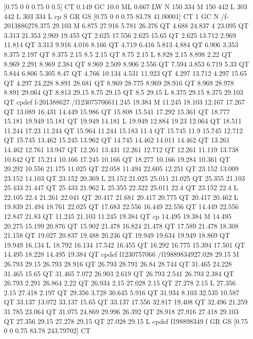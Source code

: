 [0.75 0 0 0.75 0 0.5] CT
0.149 GC
10.0 ML
0.667 LW
N
150 334 M
150 442 L
303 442 L
303 334 L
cp
S
GR
GS
[0.75 0 0 0.75 83.78 41.00001] CT
1 GC
N
/f-201388627{8.375 29.103 M
6.875 27.916 5.781 26.376 QT
4.688 24.837 4 23.095 QT
3.313 21.353 2.969 19.455 QT
2.625 17.556 2.625 15.65 QT
2.625 13.712 2.969 11.814 QT
3.313 9.916 4.016 8.166 QT
4.719 6.416 5.813 4.884 QT
6.906 3.353 8.375 2.197 QT
8.375 2.15 8.5 2.15 QT
8.75 2.15 L
8.828 2.15 8.898 2.22 QT
8.969 2.291 8.969 2.384 QT
8.969 2.509 8.906 2.556 QT
7.594 3.853 6.719 5.33 QT
5.844 6.806 5.305 8.47 QT
4.766 10.134 4.531 11.923 QT
4.297 13.712 4.297 15.65 QT
4.297 24.228 8.891 28.681 QT
8.969 28.775 8.969 28.916 QT
8.969 28.978 8.891 29.064 QT
8.813 29.15 8.75 29.15 QT
8.5 29.15 L
8.375 29.15 8.375 29.103 QT
cp}def
f-201388627
/f1230757066{11.245 19.384 M
11.245 18.103 12.167 17.267 QT
13.089 16.431 14.449 15.986 QT
15.808 15.541 17.292 15.361 QT
18.777 15.181 19.949 15.181 QT
19.949 14.181 L
19.949 12.884 19.23 12.064 QT
18.511 11.244 17.23 11.244 QT
15.964 11.244 15.183 11.4 QT
15.745 11.9 15.745 12.712 QT
15.745 13.462 15.245 13.962 QT
14.745 14.462 14.011 14.462 QT
13.261 14.462 12.761 13.947 QT
12.261 13.431 12.261 12.712 QT
12.261 11.119 13.738 10.642 QT
15.214 10.166 17.245 10.166 QT
18.277 10.166 19.284 10.361 QT
20.292 10.556 21.175 11.025 QT
22.058 11.494 22.605 12.251 QT
23.152 13.009 23.152 14.103 QT
23.152 20.369 L
23.152 21.025 25.011 21.025 QT
25.355 21.103 25.433 21.447 QT
25.433 21.962 L
25.355 22.322 25.011 22.4 QT
23.152 22.4 L
22.105 22.4 21.261 22.041 QT
20.417 21.681 20.417 20.775 QT
20.417 20.462 L
19.839 21.494 18.761 22.025 QT
17.683 22.556 16.449 22.556 QT
14.449 22.556 12.847 21.83 QT
11.245 21.103 11.245 19.384 QT
cp
14.495 19.384 M
14.495 20.275 15.199 20.876 QT
15.902 21.478 16.824 21.478 QT
17.589 21.478 18.308 21.158 QT
19.027 20.837 19.488 20.236 QT
19.949 19.634 19.949 18.869 QT
19.949 16.134 L
18.792 16.134 17.542 16.455 QT
16.292 16.775 15.394 17.501 QT
14.495 18.228 14.495 19.384 QT
cp}def
f1230757066
/f198898349{27.028 29.15 M
26.793 29.15 26.793 28.916 QT
26.793 28.791 26.84 28.744 QT
31.465 24.228 31.465 15.65 QT
31.465 7.072 26.903 2.619 QT
26.793 2.541 26.793 2.384 QT
26.793 2.291 26.864 2.22 QT
26.934 2.15 27.028 2.15 QT
27.278 2.15 L
27.356 2.15 27.418 2.197 QT
29.356 3.728 30.645 5.916 QT
31.934 8.103 32.535 10.587 QT
33.137 13.072 33.137 15.65 QT
33.137 17.556 32.817 19.408 QT
32.496 21.259 31.785 23.064 QT
31.075 24.869 29.996 26.392 QT
28.918 27.916 27.418 29.103 QT
27.356 29.15 27.278 29.15 QT
27.028 29.15 L
cp}def
f198898349
f
GR
GS
[0.75 0 0 0.75 83.78 243.79702] CT

